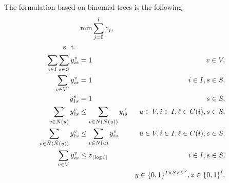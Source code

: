 The formulation based on binomial trees is the following:
\begin{subequations}\label{mod:partition}
\begin{align}
\notag &\min\sum\limits_{j=0}^{\bar{t}}z_j,\\
\notag \text{s. t. } \\
\label{mod:part:nodeBelongs} \sum\limits_{i\in I}\sum\limits_{s\in S}y^v_{is} & = 1 & v\in V,\\
\label{mod:part:treeHasIJ} \sum\limits_{v\in V'}y^v_{is} & = 1 & i\in I,s\in S,\\
\label{mod:part:source1} y_{1s}^s & = 1  & s\in S,\\
\label{mod:part:followArcsA}\sum\limits_{v\in \bar{N}(u)}y^v_{\ell s}&\leq \sum\limits_{v\in N(\bar{N}(u))}y_{is}^{v} & u\in V,i\in I,\ell\in C(i), s\in S,  \\
\label{mod:part:followArcsB}\sum\limits_{v\in \bar{N}(\bar{N}(u))}y^v_{\ell s}&\leq \sum\limits_{v\in N(u)} y_{is}^{v} & u\in V,i\in I,\ell\in C(i), s\in S,\\
\label{mod:part:yzrel}\sum\limits_{v\in V}y^v_{is} & \leq z_{\lceil\log i\rceil} & i\in I,s\in S,\\
\label{mod:part:dim}&&y \in \{0,1\}^{I\times S\times V'}, z\in \{0,1\}^{\bar{t}}.
\end{align}~
\end{subequations}

